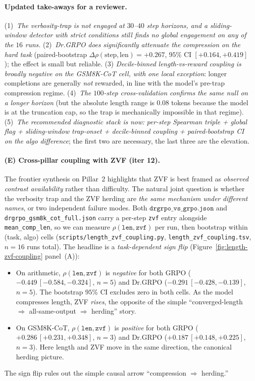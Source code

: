 \documentclass{article}
\begin{document}
\paragraph{Updated take-aways for a reviewer.}
(1)~\emph{The verbosity-trap is not engaged at $30$--$40$ step
horizons, and a sliding-window detector with strict
conditions still finds no global engagement on any of the
$16$ runs.} (2)~\emph{Dr.GRPO does \emph{significantly}
attenuate the compression on the hard task} (paired-bootstrap
$\Delta\rho(\text{step},\text{len})=+0.267$, $95\%$ CI
$[+0.164,+0.419]$); the effect is small but reliable. (3)
\emph{Decile-binned length-vs-reward coupling is broadly
\emph{negative} on the GSM8K-CoT cell, with one local exception}:
longer completions are generally
\emph{not} rewarded, in line with the model's
pre-trap compression regime. (4)~\emph{The $100$-step
cross-validation confirms the same null on a longer horizon}
(but the absolute length range is $0.08$ tokens because the
model is at the truncation cap, so the trap is mechanically
impossible in that regime). (5)~\emph{The recommended
diagnostic stack is now: per-step Spearman triple + global flag
+ sliding-window trap-onset + decile-binned coupling +
paired-bootstrap CI on the algo difference}; the first two are
necessary, the last three are the elevation.

\paragraph{(E) Cross-pillar coupling with ZVF (iter 12).}
The frontier synthesis on Pillar~2 highlights that ZVF is best
framed as \emph{observed contrast availability} rather than
difficulty. The natural joint question is whether the verbosity
trap and the ZVF herding are \emph{the same mechanism under
different names}, or two independent failure modes. Both
$\texttt{drgrpo\_vs\_grpo.json}$ and
\texttt{drgrpo\_gsm8k\_cot\_full.json} carry a per-step
\texttt{zvf} entry alongside \texttt{mean\_comp\_len}, so we can
measure $\rho(\texttt{len}, \texttt{zvf})$ per run, then bootstrap
within (task, algo) cells
(\texttt{scripts/length\_zvf\_coupling.py},
\texttt{length\_zvf\_coupling.tsv}, $n{=}16$ runs total).
The headline is a \emph{task-dependent sign flip}
(Figure~\ref{fig:length-zvf-coupling} panel~(A)):
\begin{itemize}
\item On arithmetic, $\rho(\texttt{len}, \texttt{zvf})$ is
  \emph{negative} for both GRPO ($-0.449\,[-0.584,-0.324]$, $n{=}5$)
  and Dr.GRPO ($-0.291\,[-0.428,-0.139]$, $n{=}5$). The bootstrap
  $95\%$ CI excludes zero in both cells. As the model compresses
  length, ZVF \emph{rises}, the opposite of the simple
  ``converged-length $\Rightarrow$ all-same-output $\Rightarrow$
  herding'' story.
\item On GSM8K-CoT, $\rho(\texttt{len}, \texttt{zvf})$ is
  \emph{positive} for both GRPO ($+0.286\,[+0.231,+0.348]$, $n{=}3$)
  and Dr.GRPO ($+0.187\,[+0.148,+0.225]$, $n{=}3$). Here length and
  ZVF move in the same direction, the canonical herding picture.
\end{itemize}
The sign flip rules out the simple causal arrow
``compression $\Rightarrow$ herding.''
\end{document}
